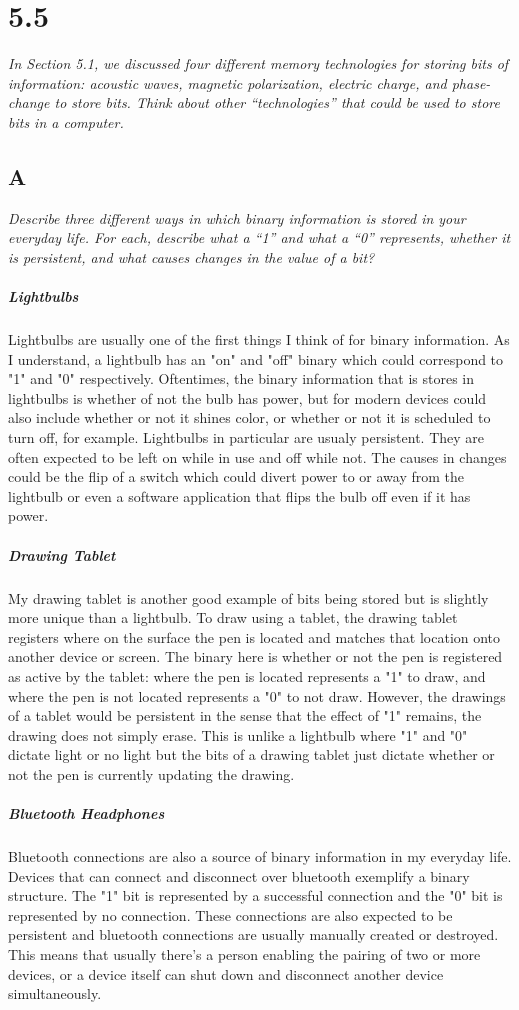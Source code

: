 \documentclass[10pt]{article}
\begin{document}
\section{5.5}
\textit{In Section 5.1, we discussed four different memory technologies for storing bits of
information: acoustic waves, magnetic polarization, electric charge, and phase-change to
store bits. Think about other “technologies” that could be used to store bits in a computer.
}
\subsection{A}
\textit{Describe three different ways in which binary information is stored in your everyday
life. For each, describe what a “1” and what a “0” represents, whether it is persistent,
and what causes changes in the value of a bit?}
\subparagraph{Lightbulbs} Lightbulbs are usually one of the first things I think of for binary information. As I understand, a lightbulb has an "on" and "off" binary
which could correspond to "1" and "0" respectively. Oftentimes, the binary information that is stores in lightbulbs is whether of not the bulb has power, but for 
modern devices could also include whether or not it shines color, or whether or not it is scheduled to turn off, for example. Lightbulbs in particular are usualy persistent. 
They are often expected to be left on while in use and off while not. The causes in changes could be the flip of a switch which could divert power to or away from the lightbulb
or even a software application that flips the bulb off even if it has power. 
\subparagraph{Drawing Tablet} My drawing tablet is another good example of bits being stored but is slightly more unique than a lightbulb. To draw using a tablet, the drawing 
tablet registers where on the surface the pen is located and matches that location onto another device or screen. The binary here is whether or not the pen is registered as active
by the tablet: where the pen is located represents a "1" to draw, and where the pen is not located represents a "0" to not draw. However, the drawings of a tablet would be persistent
in the sense that the effect of "1" remains, the drawing does not simply erase. This is unlike a lightbulb where "1" and "0" dictate light or no light but the bits of a drawing tablet just dictate
whether or not the pen is currently updating the drawing. 
\subparagraph{Bluetooth Headphones} Bluetooth connections are also a source of binary information in my everyday life. Devices that can connect and disconnect over bluetooth exemplify 
a binary structure. The "1" bit is represented by a successful connection and the "0" bit is represented by no connection. These connections are also expected to be persistent and bluetooth 
connections are usually manually created or destroyed. This means that usually there's a person enabling the pairing of two or more devices, or a device itself can shut down and disconnect 
another device simultaneously. 
\end{document}
